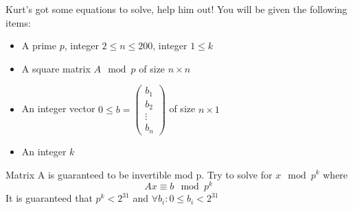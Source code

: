 Kurt's got some equations to solve, help him out! You will be given the following items:
\begin{itemize}
\item A prime $p$, integer $2\leq n\leq 200$, integer $1\leq k$
\item A square matrix $A\mod p$ of size $n\times n$
\item An integer vector $0\leq b=\left(\begin{array}{c}b_1\\b_2\\\vdots\\b_n\end{array}\right)$ of size $n\times 1$
\item An integer $k$
\end{itemize}

Matrix A is guaranteed to be invertible mod p. Try to solve for $x\mod p^k$ where
$$
Ax\equiv b\mod p^k
$$
It is guaranteed that $p^k<2^{31}$ and $\forall b_i: 0\leq b_i<2^{31}$

